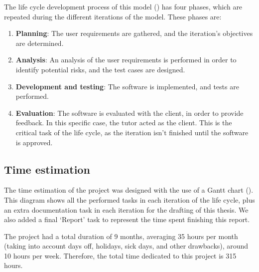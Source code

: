 The life cycle development process of this model () has four phases, which are repeated during the different iterations of the model. These phases are:
\begin{enumerate}
  \item \textbf{Planning}: The user requirements are gathered, and the iteration's objectives are determined.
  \item \textbf{Analysis}: An analysis of the user requirements is performed in order to identify potential risks, and the test cases are designed.
  \item \textbf{Development and testing}: The software is implemented, and tests are performed.
  \item \textbf{Evaluation}: The software is evaluated with the client, in order to provide feedback. In this specific case, the tutor acted as the client. This is the critical task of the life cycle, as the iteration isn't finished until the software is approved.
\end{enumerate}



\subsection{Time estimation}\label{subsec:time-estimation}
The time estimation of the project was designed with the use of a Gantt chart \parencite{clark1922gantt} (). This diagram shows all the performed tasks in each iteration of the life cycle, plus an extra documentation task in each iteration for the drafting of this thesis. We also added a final `Report' task to represent the time spent finishing this report.

The project had a total duration of 9 months, averaging 35 hours per month (taking into account days off, holidays, sick days, and other drawbacks), around 10 hours per week. Therefore, the total time dedicated to this project is 315 hours.


